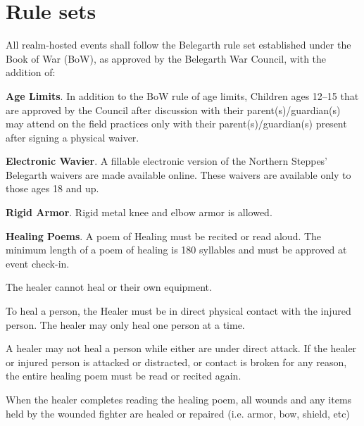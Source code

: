 \documentclass[12pt]{article}
\begin{document}
\section{Rule sets}
\begin{level}
    \item All realm-hosted events shall follow the Belegarth rule set established under the Book of War (BoW), as approved by the Belegarth War Council, with the addition of:
    \begin{level}
        \item \textbf{Age Limits}. In addition to the BoW rule of age limits, Children ages 12--15 that are approved by the Council after discussion with their parent(s)/guardian(s) may attend on the field practices only with their parent(s)/guardian(s) present after signing a physical waiver.
        \item \textbf{Electronic Wavier}. A fillable electronic version of the Northern Steppes' Belegarth waivers are made available online. These waivers are available only to those ages 18 and up.
        \item \textbf{Rigid Armor}. Rigid metal knee and elbow armor is allowed.
        \item \textbf{Healing Poems}. A poem of Healing must be recited or read aloud. The minimum length of a poem of healing is 180 syllables and must be approved at event check-in.
        \begin{level}
            \item The healer cannot heal  or their own equipment.
            \item To heal a person, the Healer must be in direct physical contact with the injured person. The healer may only heal one person at a time.
            \item A healer may not heal a person while either are under direct attack. If the healer or injured person is attacked or distracted, or contact is broken for any reason, the entire healing poem must be read or recited again.
            \item When the healer completes reading the healing poem, all wounds and any items held by the wounded fighter are healed or repaired (i.e. armor, bow, shield, etc)
        \end{level}
    \end{level}
    \item {}
\end{level}
\end{document}
